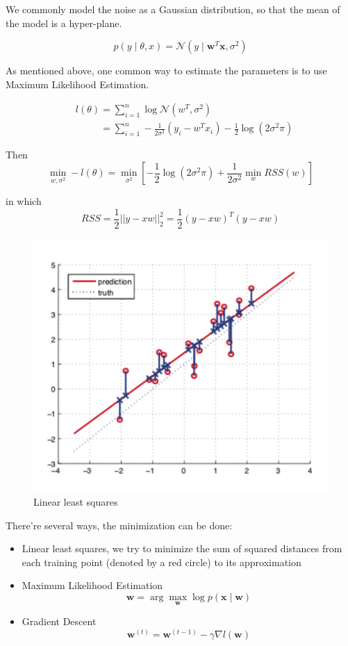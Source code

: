 \documentclass[10pt,twocolumn,letterpaper]{article}
\begin{document}
	We commonly model the noise as a Gaussian distribution, so that the mean of the model is a hyper-plane.
	
	\[p(y \mid \theta, x) = \mathcal{N}(y \mid \mathbf{w}^T\mathbf{x}, \sigma^2)\]
	
	As mentioned above, one common way to estimate the parameters is to use Maximum Likelihood Estimation\cite{murphy_2013}.
	
	\begin{align}
	    & l(\theta) = \sum_{i = 1}^n \log \mathcal{N}(w^T, \sigma^2)\nonumber\\
	    & \phantom{l(\theta)} = \sum_{i = 1}^n-\frac{1}{2\sigma^2}(y_i - w^Tx_i) - \frac{1}{2}\log (2\sigma^2\pi)\nonumber
	\end{align}

Then \[\min_{w, \sigma^2} -l(\theta) = \min_{\sigma^2}\left[- \frac{1}{2}\log (2\sigma^2\pi) + \frac{1}{2\sigma^2} \min_w RSS(w)\right]\]

in which
	\[RSS = \frac{1}{2}||y - xw||^2_2 = \frac{1}{2}(y - xw)^T(y - xw)\]
	
	\begin{figure}[h]
			\begin{center}
				\includegraphics[width=0.8\linewidth]{images/linear}
				\caption{Linear least squares\cite{murphy_2013}}
			\end{center}
		\end{figure}

	There're several ways, the minimization can be done:
	\begin{itemize}
		\item Linear least squares, we try to minimize the sum of squared distances from each training point (denoted by a red circle) to its approximation\cite{murphy_2013}
		\item Maximum Likelihood Estimation
			\[\mathbf{w} = \arg\max_{\mathbf{w}} \log p(\mathbf{x} \mid \mathbf{w})\]
		\item Gradient Descent
			\[\mathbf{w}^{(t)} = \mathbf{w}^{(t - 1)} - \gamma \nabla l(\mathbf{w})\]
	\end{itemize}
	
\end{document}
